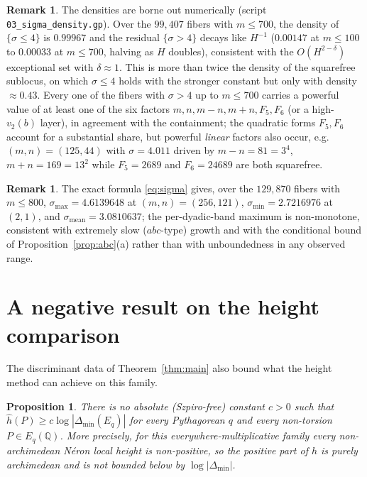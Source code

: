 \documentclass[11pt,reqno]{amsart}
\theoremstyle{plain}
\newtheorem{proposition}[theorem]{Proposition}
\theoremstyle{definition}
\newtheorem{remark}[theorem]{Remark}
\newcommand{\Q}{\mathbb{Q}}
\newcommand{\hath}{\hat{h}}
\begin{document}
\begin{remark}\label{rem:numerics}
The densities are borne out numerically (script \texttt{03\_sigma\_density.gp}).
Over the $99{,}407$ fibers with $m\le700$, the density of $\{\sigma\le4\}$ is
$0.99967$ and the residual $\{\sigma>4\}$ decays like $H^{-1}$ ($0.00147$ at
$m\le100$ to $0.00033$ at $m\le700$, halving as $H$ doubles), consistent with the
$O(H^{2-\delta})$ exceptional set with $\delta\approx1$. This is more than twice
the density of the squarefree sublocus, on which $\sigma\le4$ holds with the
stronger constant but only with density $\approx0.43$. Every one of the fibers with
$\sigma>4$ up to $m\le700$ carries a powerful value of at least one of the six
factors $m,n,m-n,m+n,F_5,F_6$ (or a high-$v_2(b)$ layer), in agreement with the
containment; the quadratic forms $F_5,F_6$ account for a substantial share, but
powerful \emph{linear} factors also occur, e.g.\ $(m,n)=(125,44)$ with $\sigma=4.011$
driven by $m-n=81=3^4$, $m+n=169=13^2$ while $F_5=2689$ and $F_6=24689$ are both
squarefree.
\end{remark}

\begin{remark}\label{rem:numerics2}
The exact formula \eqref{eq:sigma} gives, over the $129{,}870$ fibers with
$m\le800$, $\sigma_{\max}=4.6139648$ at $(m,n)=(256,121)$,
$\sigma_{\min}=2.7216976$ at $(2,1)$, and $\sigma_{\mathrm{mean}}=3.0810637$; the
per-dyadic-band maximum is non-monotone, consistent with extremely slow
($abc$-type) growth and with the conditional bound of
Proposition~\ref{prop:abc}(a) rather than with unboundedness in any observed range.
\end{remark}

\section{A negative result on the height comparison}

The discriminant data of Theorem~\ref{thm:main} also bound what the height method
can achieve on this family.

\begin{proposition}\label{prop:noc}
There is no absolute \textup{(}Szpiro-free\textup{)} constant $c>0$ such that
$\hath(P)\ge c\log|\Delta_{\min}(E_q)|$ for every Pythagorean $q$ and every
non-torsion $P\in E_q(\Q)$. More precisely, for this everywhere-multiplicative
family every non-archimedean N\'eron local height is non-positive, so the positive
part of $\hath$ is purely archimedean and is not bounded below by
$\log|\Delta_{\min}|$.
\end{proposition}
\end{document}
